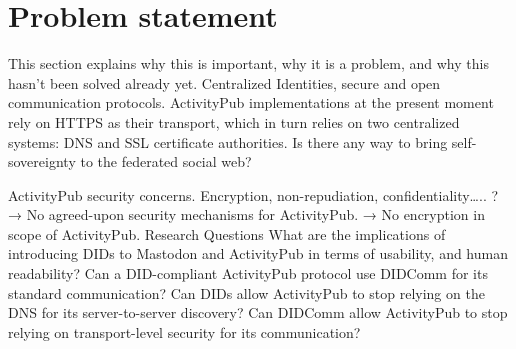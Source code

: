 


 
\section{Problem statement}
 
This section explains why this is important, why it is a problem, and why this hasn't been solved already yet. Centralized Identities, secure and open communication protocols. 
ActivityPub implementations at the present moment rely on HTTPS as their transport, which in turn relies on two centralized systems: DNS and SSL certificate authorities. Is there any way to bring self-sovereignty to the federated social web? \cite{webber_sporny_2017}
 
ActivityPub security concerns. Encryption, non-repudiation, confidentiality….. ? 
→ No agreed-upon security mechanisms for ActivityPub. 
→ No encryption in scope of ActivityPub.
Research Questions
What are the implications of introducing DIDs to Mastodon and ActivityPub in terms of usability, and human readability?
Can a DID-compliant ActivityPub protocol use DIDComm for its standard communication?
Can DIDs allow ActivityPub to stop relying on the DNS for its server-to-server discovery?
Can DIDComm allow ActivityPub to stop relying on transport-level security for its communication?

